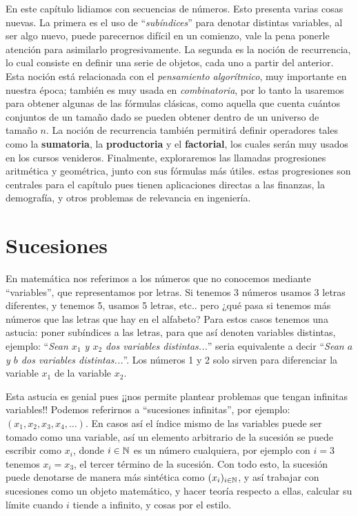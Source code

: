 
En este capítulo lidiamos con secuencias de números. Esto presenta varias cosas nuevas.
La primera es el uso de ``\emph{subíndices}'' para denotar distintas variables, al ser algo nuevo, puede parecernos difícil en un comienzo, vale la pena ponerle atención para asimilarlo progresivamente.
La segunda es la noción de recurrencia, lo cual consiste en definir una serie de objetos, cada uno a partir del anterior. 
Esta noción está relacionada con el \emph{pensamiento algorítmico}, muy importante en nuestra época; también es muy usada en \emph{combinatoria}, por lo tanto la usaremos para obtener algunas de las fórmulas clásicas, como aquella que cuenta cuántos conjuntos de un tamaño dado se pueden obtener dentro de un universo de tamaño $n$.
La noción de recurrencia también permitirá definir operadores tales como la {\bf sumatoria}, la {\bf productoria} y el {\bf factorial}, los cuales serán muy usados en los cursos venideros.
Finalmente, exploraremos las llamadas progresiones aritmética y geométrica, junto con sus fórmulas más útiles.
estas progresiones son centrales para el capítulo pues tienen aplicaciones directas a las finanzas, la demografía, y otros problemas de relevancia en ingeniería.

\section{Sucesiones}

En matemática nos referimos a los números que no conocemos mediante ``variables'', que representamos por letras.
Si tenemos 3 números usamos 3 letras diferentes, y tenemos 5, usamos 5 letras, etc.. pero ¿qué pasa si tenemos más números que las letras que hay en el alfabeto? Para estos casos tenemos una astucia: poner subíndices a las letras, para que así denoten variables distintas, ejemplo: ``\emph{Sean $x_1$ y $x_2$ dos variables distintas...}'' seria equivalente a decir ``\emph{Sean $a$ y $b$ dos variables distintas...}''. Los números 1 y 2 solo sirven para diferenciar la variable $x_1$ de la variable $x_2$.

Esta astucia es genial pues ¡¡nos permite plantear problemas que tengan infinitas variables!! Podemos referirnos a ``sucesiones infinitas'', por ejemplo: $(x_1,x_2,x_3,x_4,\dots )$.
En casos así el índice mismo de las variables puede ser tomado como una variable, así un elemento arbitrario de la sucesión se puede escribir como $x_i$, donde $i\in\mathbb{N}$ es un número cualquiera, por ejemplo con $i=3$ tenemos $x_i=x_3$, el tercer término de la sucesión.
Con todo esto, la sucesión puede denotarse de manera más sintética como $(x_i)_{i\in\mathbb{N}}$, y así trabajar con sucesiones como un objeto matemático, y hacer teoría respecto a ellas, calcular su límite cuando $i$ tiende a infinito, y cosas por el estilo.

